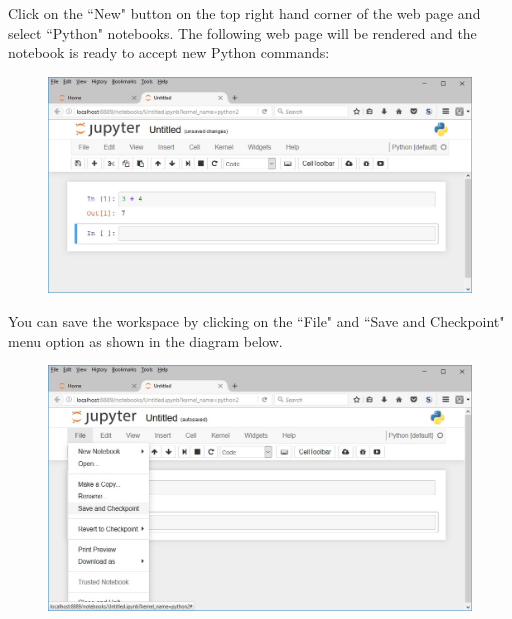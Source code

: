 \documentclass{article}
\begin{document}
Click on the ``New" button on the top right hand corner of the web page and select ``Python" notebooks. The following web page will be rendered and the notebook is ready to accept new Python commands:
\begin{figure}[h!]
\centering
  \includegraphics[width=4.5in]{notebook2.jpg}\\
\end{figure}

You can save the workspace by clicking on the ``File" and ``Save and Checkpoint" menu option as shown in the diagram below.

\begin{figure}[h!]
\centering
  \includegraphics[width=4.5in]{notebook3.jpg}\\
\end{figure}
\end{document}
